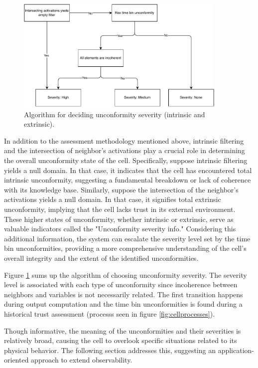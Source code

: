 \begin{figure}[h!]
\centering
    \includegraphics[width=0.9\textwidth]{figures/chapter4/cell/states.pdf}
    \caption{Algorithm for deciding unconformity severity (intrinsic and extrinsic).}
    \label{fig:severity}
\end{figure}

In addition to the assessment methodology mentioned above, intrinsic filtering and the intersection of neighbor's activations play a crucial role in determining the overall unconformity state of the cell. Specifically, suppose intrinsic filtering yields a null domain. In that case, it indicates that the cell has encountered total intrinsic unconformity, suggesting a fundamental breakdown or lack of coherence with its knowledge base. Similarly, suppose the intersection of the neighbor's activations yields a null domain. In that case, it signifies total extrinsic unconformity, implying that the cell lacks trust in its external environment. These higher states of unconformity, whether intrinsic or extrinsic, serve as valuable indicators called the "Unconformity severity info." Considering this additional information, the system can escalate the severity level set by the time bin unconformities, providing a more comprehensive understanding of the cell's overall integrity and the extent of the identified unconformities.

Figure \ref{fig:severity} sums up the algorithm of choosing unconformity severity. The severity level is associated with each type of unconformity since incoherence between neighbors and variables is not necessarily related. The first transition happens during output computation and the time bin unconformities is found during a historical trust assessment (processs seen in figure \ref{fig:cellprocesses}).

Though informative, the meaning of the unconformities and their severities is relatively broad, causing the cell to overlook specific situations related to its physical behavior. The following section addresses this, suggesting an application-oriented approach to extend observability.

